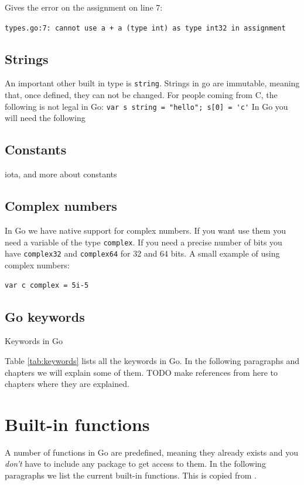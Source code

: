 
Gives the error on the assignment on line 7:

\noindent\lstinline{types.go:7: cannot use a + a (type int) as type int32 in assignment}

\subsection{Strings}

An important other built in type is \lstinline{string}. Strings in go are
immutable, meaning that, once defined, they can not be changed. For
people coming from C, the following is not legal in Go:
\lstinline{var s string = "hello"; s[0] = 'c'} 
In Go you will need the following

\subsection{Constants}
iota, and more about constants

\subsection{Complex numbers}
In Go we have native support for complex numbers. If you 
want use them you need a variable of the type \lstinline{complex}. If
you need a precise number of bits you have \lstinline{complex32} and
\lstinline{complex64} for 32 and 64 bits. A small example of using complex numbers:

\lstinline{var c complex = 5i-5}

\subsection{Go keywords}
\begin{table}
\caption{Keywords in Go}
\label{tab:keywords}

\end{table}
Table \ref{tab:keywords} lists all the keywords in Go.
In the following paragraphs and chapters we will explain some of
them. TODO make references from here to chapters where they are
explained.

\section{Built-in functions}
A number of functions in Go are predefined, meaning they already
exists and you \emph{don't} have to include any package to get
access to them. In the following paragraphs we list the current 
built-in functions. This is copied from \cite{go_spec}.

